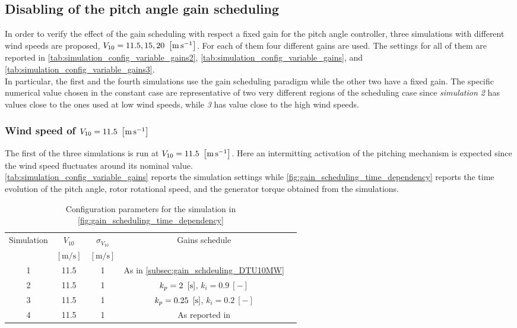 \subsection{Disabling of the pitch angle gain scheduling}\label{subsec:gain_scheduling_disabling}
In order to verify the effect of the gain scheduling with respect a fixed gain for the pitch angle controller, three simulations with different wind speeds are proposed, $V_{10} = 11.5, 15, 20 \ \left[\si{\meter\per\second}\right]$. For each of them four different gains are used. The settings for all of them are reported in  \autoref{tab:simulation_config_variable_gains2}, \autoref{tab:simulation_config_variable_gains}, and \autoref{tab:simulation_config_variable_gains3}. \\
In particular, the first and the fourth simulations use the gain scheduling paradigm while the other two have a fixed gain. The specific numerical value chosen in the constant case are representative of two very different regions of the scheduling case since \textit{simulation 2} has values close to the ones used at low wind speeds, while \textit{3} has value close to the high wind speeds. 

\subsubsection{Wind speed of  $V_{10} = 11.5 \ \mesunt{\meter\per\second}$}
The first of the three simulations is run at $V_{10} = 11.5 \ \mesunt{\meter\per\second}$. Here an intermitting activation of the pitching mechanism is expected since the wind speed fluctuates around its nominal value.\\
\autoref{tab:simulation_config_variable_gains} reports the simulation settings while \autoref{fig:gain_scheduling_time_dependency} reports the time evolution of the pitch angle, rotor rotational speed, and the generator torque obtained from the simulations. 

\begin{table}[htb]
  \caption{Configuration parameters for the simulation in \autoref{fig:gain_scheduling_time_dependency}}
  \centering
  \begin{tabular}{ccccc}
  \toprule
    Simulation & $V_{10}$  & $\sigma_{V_{10}}$ & Gains schedule \\ 
     & $\left[\si{\meter\per\second}\right]$ & $\left[\si{\meter\per\second}\right]$ & \\ \midrule       
     1 & 11.5 & 1 & As in \autoref{subsec:gain_schdeuling_DTU10MW}  \\
     2 & 11.5 & 1 & $k_p = 2 \ \mesunt{\second}$, $k_i=0.9 \ [-]$ \\
     3 & 11.5 & 1 & $k_p = 0.25 \ \mesunt{\second}$, $k_i=0.2 \ [-]$  \\
     4 & 11.5 & 1 & As reported in \cite{Olimpo_Anaya‐Lara}  \\
     \bottomrule
  \end{tabular}
  \label{tab:simulation_config_variable_gains}
\end{table}


